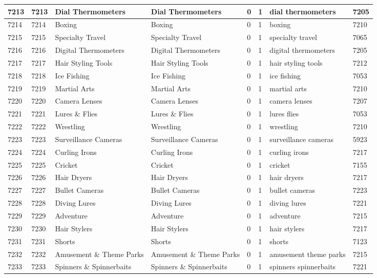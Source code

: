 \begin{longtable}{|l|l|l|l|l|l|l|l|}
7213 & 7213 & Dial Thermometers & Dial Thermometers & 0 & 1 & dial thermometers & 7205 \\ \hline 
7214 & 7214 & Boxing & Boxing & 0 & 1 & boxing & 7210 \\ \hline 
7215 & 7215 & Specialty Travel & Specialty Travel & 0 & 1 & specialty travel & 7065 \\ \hline 
7216 & 7216 & Digital Thermometers & Digital Thermometers & 0 & 1 & digital thermometers & 7205 \\ \hline 
7217 & 7217 & Hair Styling Tools & Hair Styling Tools & 0 & 1 & hair styling tools & 7212 \\ \hline 
7218 & 7218 & Ice Fishing & Ice Fishing & 0 & 1 & ice fishing & 7053 \\ \hline 
7219 & 7219 & Martial Arts & Martial Arts & 0 & 1 & martial arts & 7210 \\ \hline 
7220 & 7220 & Camera Lenses & Camera Lenses & 0 & 1 & camera lenses & 7207 \\ \hline 
7221 & 7221 & Lures \& Flies & Lures \& Flies & 0 & 1 & lures flies & 7053 \\ \hline 
7222 & 7222 & Wrestling & Wrestling & 0 & 1 & wrestling & 7210 \\ \hline 
7223 & 7223 & Surveillance Cameras & Surveillance Cameras & 0 & 1 & surveillance cameras & 5923 \\ \hline 
7224 & 7224 & Curling Irons & Curling Irons & 0 & 1 & curling irons & 7217 \\ \hline 
7225 & 7225 & Cricket & Cricket & 0 & 1 & cricket & 7155 \\ \hline 
7226 & 7226 & Hair Dryers & Hair Dryers & 0 & 1 & hair dryers & 7217 \\ \hline 
7227 & 7227 & Bullet Cameras & Bullet Cameras & 0 & 1 & bullet cameras & 7223 \\ \hline 
7228 & 7228 & Diving Lures & Diving Lures & 0 & 1 & diving lures & 7221 \\ \hline 
7229 & 7229 & Adventure & Adventure & 0 & 1 & adventure & 7215 \\ \hline 
7230 & 7230 & Hair Stylers & Hair Stylers & 0 & 1 & hair stylers & 7217 \\ \hline 
7231 & 7231 & Shorts & Shorts & 0 & 1 & shorts & 7123 \\ \hline 
7232 & 7232 & Amusement \& Theme Parks & Amusement \& Theme Parks & 0 & 1 & amusement theme parks & 7215 \\ \hline 
7233 & 7233 & Spinners \& Spinnerbaits & Spinners \& Spinnerbaits & 0 & 1 & spinners spinnerbaits & 7221 \\ \hline 

\end{longtable}

